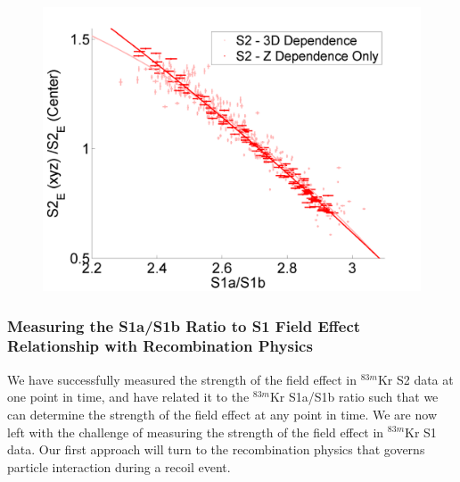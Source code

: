\begin{figure}[!h]
\includegraphics[scale=0.6]{Run04Corrections/S1aS1bvField_ZDep_3D_S2Only.png}
 \label{fig:S1aS1bField_S2}
\end{figure}


\subsubsection{Measuring the S1a/S1b Ratio to S1 Field Effect Relationship with Recombination Physics} \label{section:S1relation}

We have successfully measured the strength of the field effect in $^{83m}$Kr S2 data at one point in time, and have related it to the $^{83m}$Kr S1a/S1b ratio such that we can determine the strength of the field effect at any point in time.  We are now left with the challenge of measuring the strength of the field effect in $^{83m}$Kr S1 data. Our first approach will turn to the recombination physics that governs particle interaction during a recoil event.  

